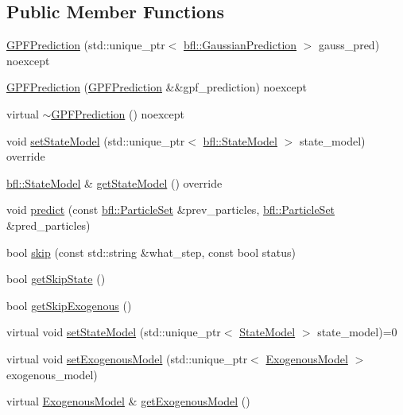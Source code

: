 \subsection*{Public Member Functions}
\begin{DoxyCompactItemize}
\item 
\mbox{\hyperlink{classbfl_1_1GPFPrediction_a03ed76dc8f4dd587389b1a3c200c8c6f}{G\+P\+F\+Prediction}} (std\+::unique\+\_\+ptr$<$ \mbox{\hyperlink{classbfl_1_1GaussianPrediction}{bfl\+::\+Gaussian\+Prediction}} $>$ gauss\+\_\+pred) noexcept
\item 
\mbox{\hyperlink{classbfl_1_1GPFPrediction_a4dffe9e873409370675450840fe93236}{G\+P\+F\+Prediction}} (\mbox{\hyperlink{classbfl_1_1GPFPrediction}{G\+P\+F\+Prediction}} \&\&gpf\+\_\+prediction) noexcept
\item 
virtual \mbox{\hyperlink{classbfl_1_1GPFPrediction_a9758eba10d2b369b20912ff47bcf937b}{$\sim$\+G\+P\+F\+Prediction}} () noexcept
\item 
void \mbox{\hyperlink{classbfl_1_1GPFPrediction_a29d7a4777cb8007a356b98e66db28f53}{set\+State\+Model}} (std\+::unique\+\_\+ptr$<$ \mbox{\hyperlink{classbfl_1_1StateModel}{bfl\+::\+State\+Model}} $>$ state\+\_\+model) override
\item 
\mbox{\hyperlink{classbfl_1_1StateModel}{bfl\+::\+State\+Model}} \& \mbox{\hyperlink{classbfl_1_1GPFPrediction_a3b8c347633b8db630af4945548980794}{get\+State\+Model}} () override
\item 
void \mbox{\hyperlink{classbfl_1_1PFPrediction_a129dcd1cccd2da9827ef0c49c90b9345}{predict}} (const \mbox{\hyperlink{classbfl_1_1ParticleSet}{bfl\+::\+Particle\+Set}} \&prev\+\_\+particles, \mbox{\hyperlink{classbfl_1_1ParticleSet}{bfl\+::\+Particle\+Set}} \&pred\+\_\+particles)
\item 
bool \mbox{\hyperlink{classbfl_1_1PFPrediction_a364cc35a151e5298c4024d681f3e04d9}{skip}} (const std\+::string \&what\+\_\+step, const bool status)
\item 
bool \mbox{\hyperlink{classbfl_1_1PFPrediction_a323ca5612dd7ad924fd448a629359ad2}{get\+Skip\+State}} ()
\item 
bool \mbox{\hyperlink{classbfl_1_1PFPrediction_a432b8e84dbf00432158aa82312386d63}{get\+Skip\+Exogenous}} ()
\item 
virtual void \mbox{\hyperlink{classbfl_1_1PFPrediction_ac39683650d7f89c59f1426dd7743354e}{set\+State\+Model}} (std\+::unique\+\_\+ptr$<$ \mbox{\hyperlink{classbfl_1_1StateModel}{State\+Model}} $>$ state\+\_\+model)=0
\item 
virtual void \mbox{\hyperlink{classbfl_1_1PFPrediction_ada843698204584e97d4ff6728c8e8264}{set\+Exogenous\+Model}} (std\+::unique\+\_\+ptr$<$ \mbox{\hyperlink{classbfl_1_1ExogenousModel}{Exogenous\+Model}} $>$ exogenous\+\_\+model)
\item 
virtual \mbox{\hyperlink{classbfl_1_1ExogenousModel}{Exogenous\+Model}} \& \mbox{\hyperlink{classbfl_1_1PFPrediction_aefa127a440649447e8ac659ef65b7a2a}{get\+Exogenous\+Model}} ()
\end{DoxyCompactItemize}

